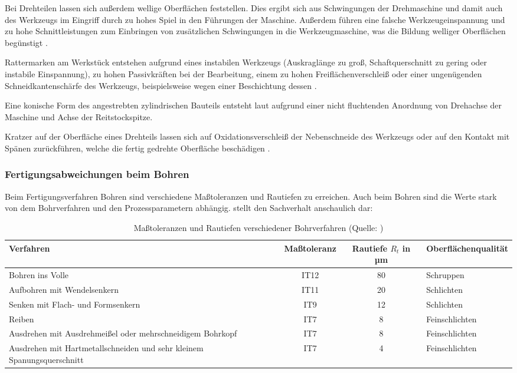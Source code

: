 Bei Drehteilen lassen sich außerdem wellige Oberflächen feststellen. Dies ergibt sich aus Schwingungen der Drehmaschine und damit auch des Werkzeugs im Eingriff durch zu hohes Spiel in den Führungen der Maschine. Außerdem führen eine falsche Werkzeugeinspannung und zu hohe Schnittleistungen zum Einbringen von zusätzlichen Schwingungen in die Werkzeugmaschine, was die Bildung welliger Oberflächen begünstigt \cite{Dietrich.2014}. 

Rattermarken am Werkstück entstehen aufgrund eines instabilen Werkzeugs (Auskraglänge zu groß, Schaftquerschnitt zu gering oder instabile Einspannung), zu hohen Passivkräften bei der Bearbeitung, einem zu hohen Freiflächenverschleiß oder einer ungenügenden Schneidkantenschärfe des Werkzeugs, beispielsweise wegen einer Beschichtung dessen \cite{Schonherr.2002}.

Eine konische Form des angestrebten zylindrischen Bauteils entsteht laut \cite{Dietrich.2014} aufgrund einer nicht fluchtenden Anordnung von Drehachse der Maschine und Achse der Reitstockspitze. 

Kratzer auf der Oberfläche eines Drehteils lassen sich auf Oxidationsverschleiß der Nebenschneide des Werkzeugs oder auf den Kontakt mit Spänen zurückführen, welche die fertig gedrehte Oberfläche beschädigen \cite{Schonherr.2002}. 

\subsubsection {Fertigungsabweichungen beim Bohren}

Beim Fertigungsverfahren Bohren sind verschiedene Maßtoleranzen und Rautiefen zu erreichen. Auch beim Bohren sind die Werte stark von dem Bohrverfahren und den Prozessparametern abhängig.
 stellt den Sachverhalt anschaulich dar:

\begin{table}[h]	
	
	\begin{tabularx}{\columnwidth}{|X|c|c|l|}	
		\hline
		\textbf{Verfahren}&\textbf{Maßtoleranz}&\textbf{Rautiefe $R_{t}$ in µm}&\textbf{Oberflächenqualität}\\
		\hline
		Bohren ins Volle&IT12&80&Schruppen\\
		\hline
		Aufbohren mit Wendelsenkern&IT11&20&Schlichten\\
		\hline
		Senken mit Flach- und Form\-senkern&IT9&12&Schlichten\\
		\hline
		Reiben&IT7&8&Feinschlichten\\
		\hline
		Ausdrehen mit Ausdrehmeißel oder mehrschneidigem Bohrkopf&IT7&8&Feinschlichten\\
		\hline
		Ausdrehen mit Hartmetallschneiden und sehr kleinem Spanungsquerschnitt&IT7&4&Feinschlichten\\
		\hline
		
	\end{tabularx}
	
	\caption{Maßtoleranzen und Rautiefen verschiedener Bohrverfahren (Quelle: \cite{Dietrich.2014})}
	\label{tab:bohrungsqualitaet}

\end{table}

